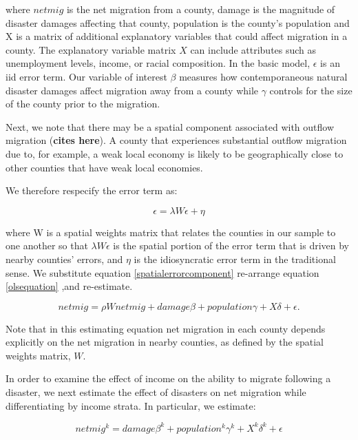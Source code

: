 \documentclass[]{article}
\begin{document}
where \(netmig\) is the net migration from a county, damage is the
magnitude of disaster damages affecting that county, population is the
county's population and X is a matrix of additional explanatory
variables that could affect migration in a county. The explanatory
variable matrix \(X\) can include attributes such as unemployment
levels, income, or racial composition. In the basic model, \(\epsilon\)
is an iid error term. Our variable of interest \(\beta\) measures how
contemporaneous natural disaster damages affect migration away from a
county while \(\gamma\) controls for the size of the county prior to the
migration.

Next, we note that there may be a spatial component associated with
outflow migration (\textbf{cites here}). A county that experiences
substantial outflow migration due to, for example, a weak local economy
is likely to be geographically close to other counties that have weak
local economies.

We therefore respecify the error term as:

\begin{equation} \label{spatialerrorcomponent}
\epsilon = \lambda W \epsilon + \eta
\end{equation}

where W is a spatial weights matrix that relates the counties in our
sample to one another so that \(\lambda W \epsilon\) is the spatial
portion of the error term that is driven by nearby counties' errors, and
\(\eta\) is the idiosyncratic error term in the traditional sense. We
substitute equation \ref{spatialerrorcomponent} re-arrange equation
\ref{olsequation} ,and re-estimate.

\begin{equation} \label{spatialerrorequation}
netmig = \rho W netmig +  damage\beta + population \gamma + X \delta +\epsilon .
\end{equation}

Note that in this estimating equation net migration in each county
depends explicitly on the net migration in nearby counties, as defined
by the spatial weights matrix, \(W\).

In order to examine the effect of income on the ability to migrate
following a disaster, we next estimate the effect of disasters on net
migration while differentiating by income strata. In particular, we
estimate:

\begin{equation} \label{incomeequation}
netmig^k =  damage\beta^k + population^k \gamma^k + X^k \delta^k +\epsilon 
\end{equation}
\end{document}
